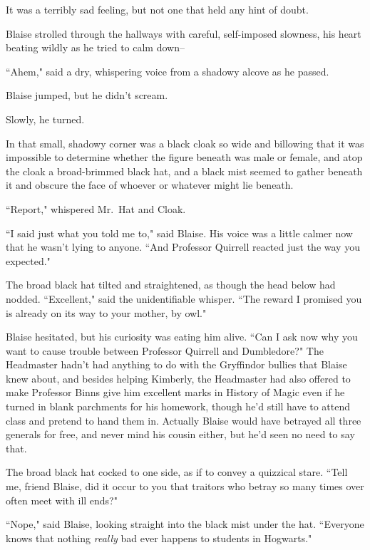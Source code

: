 It was a terribly sad feeling, but not one that held any hint of doubt.


Blaise strolled through the hallways with careful, self-imposed slowness, his heart beating wildly as he tried to calm down\---

``Ahem," said a dry, whispering voice from a shadowy alcove as he passed.

Blaise jumped, but he didn't scream.

Slowly, he turned.

In that small, shadowy corner was a black cloak so wide and billowing that it was impossible to determine whether the figure beneath was male or female, and atop the cloak a broad-brimmed black hat, and a black mist seemed to gather beneath it and obscure the face of whoever or whatever might lie beneath.

``Report," whispered Mr.~Hat and Cloak.

``I said just what you told me to," said Blaise. His voice was a little calmer now that he wasn't lying to anyone. ``And Professor Quirrell reacted just the way you expected."

The broad black hat tilted and straightened, as though the head below had nodded. ``Excellent," said the unidentifiable whisper. ``The reward I promised you is already on its way to your mother, by owl."

Blaise hesitated, but his curiosity was eating him alive. ``Can I ask now why you want to cause trouble between Professor Quirrell and Dumbledore?" The Headmaster hadn't had anything to do with the Gryffindor bullies that Blaise knew about, and besides helping Kimberly, the Headmaster had also offered to make Professor Binns give him excellent marks in History of Magic even if he turned in blank parchments for his homework, though he'd still have to attend class and pretend to hand them in. Actually Blaise would have betrayed all three generals for free, and never mind his cousin either, but he'd seen no need to say that.

The broad black hat cocked to one side, as if to convey a quizzical stare. ``Tell me, friend Blaise, did it occur to you that traitors who betray so many times over often meet with ill ends?"

``Nope," said Blaise, looking straight into the black mist under the hat. ``Everyone knows that nothing \emph{really} bad ever happens to students in Hogwarts."

